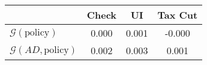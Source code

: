 \begin{tabular}{@{}lccc@{}} 
\toprule 
                          & Check      & UI    & Tax Cut    \\  \midrule 
$\mathcal{G}(\text{policy})$ & 0.000  & 0.001  & -0.000     \\ 
$\mathcal{G}(AD,\text{policy})$ & 0.002  & 0.003  & 0.001     \\ 
\end{tabular}  
